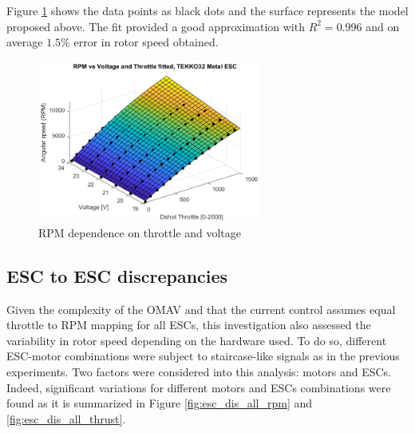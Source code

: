 Figure \ref{fig:rpm_fit} shows the data points as black dots and the surface represents the model proposed above. The fit provided a good approximation with $R^2=0.996$ and on average $1.5\%$ error in rotor speed obtained.

\begin{figure} 
    \centering
    \includegraphics[width=0.65\textwidth]{images/surf_rpm_model.png}
    \caption{RPM dependence on throttle and voltage}
    \label{fig:rpm_fit}
\end{figure}



\subsection{ESC to ESC discrepancies}
Given the complexity of the OMAV and that the current control assumes equal throttle to RPM mapping for all ESCs, this investigation also assessed the  variability in rotor speed depending on the hardware used. To do so, different ESC-motor combinations were subject to staircase-like signals as in the previous experiments. Two factors were considered into this analysis: motors and ESCs. Indeed, significant variations for different motors and ESCs combinations were found as it is summarized in Figure \ref{fig:esc_dis_all_rpm} and \ref{fig:esc_dis_all_thrust}.\\

